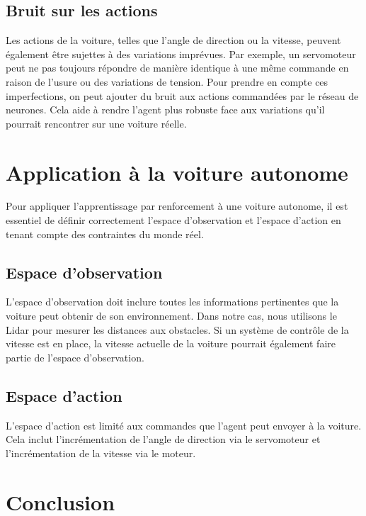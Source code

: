 \documentclass[french]{article}
\begin{document}
\subsection{Bruit sur les actions}
Les actions de la voiture, telles que l'angle de direction ou la vitesse, peuvent également être sujettes à des 
variations imprévues. Par exemple, un servomoteur peut ne pas toujours répondre de manière identique à une même 
commande en raison de l'usure ou des variations de tension. Pour prendre en compte ces imperfections, on peut 
ajouter du bruit aux actions commandées par le réseau de neurones. Cela aide à rendre l'agent plus robuste face 
aux variations qu'il pourrait rencontrer sur une voiture réelle.



\section{Application à la voiture autonome}
Pour appliquer l'apprentissage par renforcement à une voiture autonome, il est essentiel de définir correctement 
l'espace d'observation et l'espace d'action en tenant compte des contraintes du monde réel.

\subsection{Espace d'observation}
L'espace d'observation doit inclure toutes les informations pertinentes que la voiture peut obtenir de son environnement.
Dans notre cas, nous utilisons le Lidar pour mesurer les distances aux obstacles. Si un système de contrôle de 
la vitesse est en place, la vitesse actuelle de la voiture pourrait également faire partie de l'espace d'observation.

\subsection{Espace d'action}
L'espace d'action est limité aux commandes que l'agent peut envoyer à la voiture. Cela inclut l'incrémentation de 
l'angle de direction via le servomoteur et l'incrémentation de la vitesse via le moteur.



\section{Conclusion}
\end{document}
